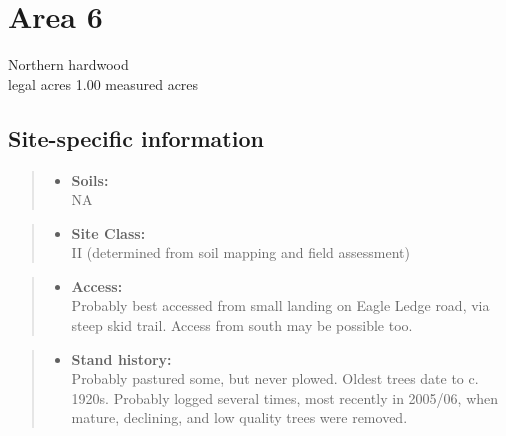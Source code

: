 \documentclass[]{tufte-handout}
\providecommand{\tightlist}{%
  \setlength{\itemsep}{0pt}\setlength{\parskip}{0pt}}
\begin{document}
\newpage

\section{Area 6}\label{area-6}

Northern hardwood\\
 legal acres \textbar{} 1.00 measured acres

\subsection{Site-specific
information}\label{site-specific-information-5}

\begin{quote}
\begin{itemize}
\tightlist
\item
  \textbf{Soils:}\\
  \indent\indent  NA
\end{itemize}
\end{quote}

\begin{quote}
\begin{itemize}
\tightlist
\item
  \textbf{Site Class:}\\
  \vspace{2pt} II (determined from soil mapping and field assessment)
\end{itemize}
\end{quote}

\begin{quote}
\begin{itemize}
\tightlist
\item
  \textbf{Access:}\\
  \vspace{2pt} Probably best accessed from small landing on Eagle Ledge
  road, via steep skid trail. Access from south may be possible too.
\end{itemize}
\end{quote}

\begin{quote}
\begin{itemize}
\tightlist
\item
  \textbf{Stand history:}\\
  \vspace{2pt} Probably pastured some, but never plowed. Oldest trees
  date to c. 1920s. Probably logged several times, most recently in
  2005/06, when mature, declining, and low quality trees were removed.
\end{itemize}
\end{quote}
\end{document}
